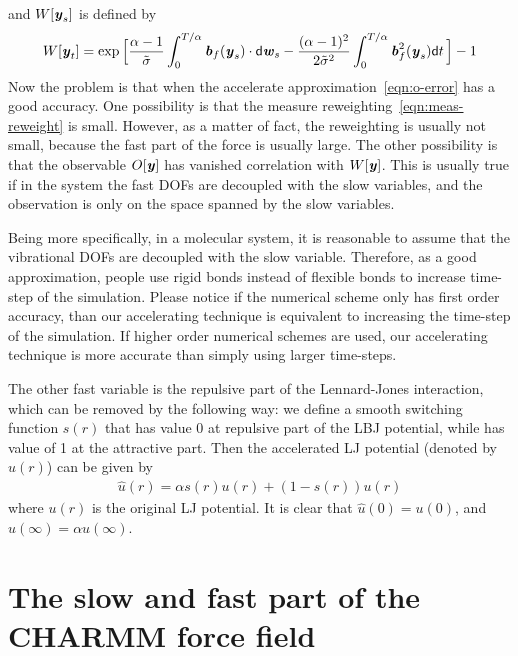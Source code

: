 \documentclass[aip,jcp,a4paper,reprint,onecolumn]{revtex4-1}
\newcommand{\vect}[1]{\textbf{\textit{#1}}}
\newcommand{\dd}{\textsf{d}}
\begin{document}
and $W[\vect y_s]$ is defined by
\begin{align}
  W[\vect y_t] = 
  \exp
  \Big[
  \frac{\alpha-1}{\tilde{\sigma}}\int_0^{T/\alpha}\vect b_f(\vect y_s)\cdot\dd\vect w_s
  -
  \frac{(\alpha-1)^2}{2\tilde\sigma^2} \int_0^{T/\alpha}\vect b_f^2(\vect y_s)\dd t\,
  \Big]
  -1
\end{align}
Now the problem is that when the accelerate
approximation~\eqref{eqn:o-error} has a good accuracy. One possibility
is that the measure reweighting~\eqref{eqn:meas-reweight} is small.
However, as a matter of fact, the reweighting is usually not small,
because the fast part of the force is usually large. The other possibility
is that the observable $O[\vect y]$ has vanished correlation with
$W[\vect y]$.
This is usually true if in the system the fast DOFs are decoupled with
the slow variables, and the observation is only on the space spanned
by the slow variables.


Being more specifically, in a molecular system, it is reasonable to
assume that the vibrational DOFs are decoupled with the slow variable.
Therefore, as a good approximation, people use rigid bonds instead of
flexible bonds to increase time-step of the simulation. Please notice
if the numerical scheme only has first order accuracy, than our accelerating
technique is equivalent to increasing the time-step of the simulation.
If higher order numerical schemes are used, our accelerating technique
is more accurate than simply using larger time-steps.

The other fast variable is the repulsive part of the Lennard-Jones
interaction, which can be removed by the following way: we define a
smooth switching function $s(r)$ that has value 0 at repulsive part of
the LBJ potential, while has value of 1 at the attractive part. Then
the accelerated LJ potential (denoted by $\hat u(r)$) can be given by
\begin{align}
  \hat u(r) = \alpha s(r) u(r) + (1 - s(r)) u(r)
\end{align}
where $u(r)$ is the original LJ potential. It is clear that
$\hat u(0) = u(0)$, and $\hat u(\infty) = \alpha u(\infty)$.



\section{The slow and fast part of the CHARMM force field}
\end{document}
